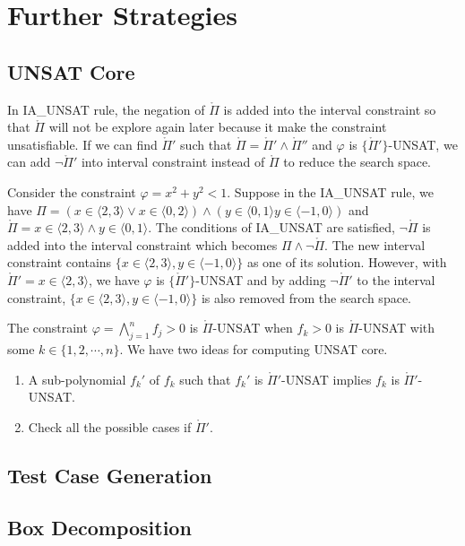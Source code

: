 \chapter{Further Strategies}
\section{UNSAT Core}
In \tiny IA\_UNSAT \normalsize rule, the negation of $\mathring\Pi$ is added into the interval constraint so that $\mathring\Pi$ will not be explore again later because it make the constraint unsatisfiable. If we can find $\mathring\Pi'$ such that $\mathring\Pi = \mathring\Pi' \wedge \mathring\Pi''$ and $\varphi$ is $\{\mathring\Pi'\}$-UNSAT, we can add $\neg\mathring\Pi'$ into interval constraint instead of $\mathring\Pi$ to reduce the search space.

\begin{example}
Consider the constraint $\varphi = x^2 + y^2 < 1$. Suppose in the \tiny IA\_UNSAT \normalsize rule, we have $\Pi = (x \in \langle 2, 3 \rangle \vee x \in \langle 0, 2 \rangle) \wedge (y \in \langle 0, 1 \rangle y \in \langle -1, 0 \rangle)$ and $\mathring\Pi = x \in \langle 2, 3 \rangle \wedge y \in \langle 0, 1 \rangle$. The conditions of \tiny IA\_UNSAT \normalsize are satisfied, $\neg \mathring\Pi$ is added into the interval constraint which becomes $\Pi \wedge \neg \mathring\Pi$. The new interval constraint contains $\{x \in \langle 2, 3 \rangle, y \in \langle -1, 0 \rangle\}$ as one of its solution. However, with $\mathring\Pi' = x \in \langle 2, 3 \rangle$, we have $\varphi$ is $\{\mathring\Pi'\}$-UNSAT and by adding $\neg\mathring\Pi'$ to the interval constraint, $\{x \in \langle 2, 3 \rangle, y \in \langle -1, 0 \rangle\}$ is also removed from the search space.
\end{example}

The constraint $\varphi = \bigwedge\limits_{j=1}^n f_j > 0$ is $\mathring\Pi$-UNSAT when $f_k > 0$ is $\mathring\Pi$-UNSAT with some $k \in \{1, 2, \cdots, n\}$. We have two ideas for computing UNSAT core.
\begin{enumerate}
\item A sub-polynomial $f_k'$ of $f_k$ such that $f_k'$ is $\mathring\Pi'$-UNSAT implies $f_k$ is $\mathring\Pi'$-UNSAT.
\item Check all the possible cases if $\mathring\Pi'$. 
\end{enumerate}
\section{Test Case Generation}
\section{Box Decomposition}